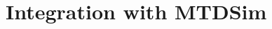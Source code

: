 \documentclass{cshonours}
\begin{document}
\section{Integration with MTDSim}
\label{sec:execution}
\label{subsec:runtime-mechanics}
\end{document}
